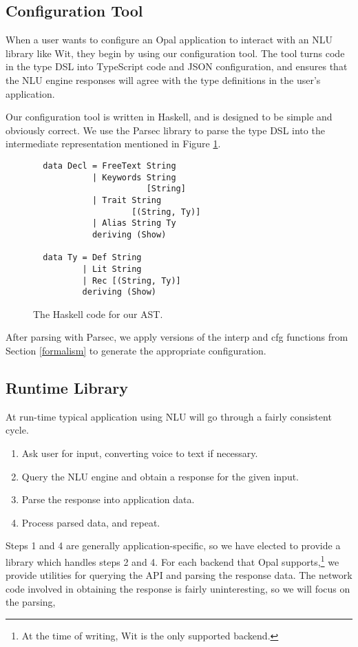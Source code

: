 \documentclass[twocolumn]{article}
\newcommand{\ff}[1]{\textsf{#1}}
\begin{document}
\subsection{Configuration Tool}
When a user wants to configure an Opal application to interact with an NLU
library like Wit, they begin by using our configuration tool. The tool turns
code in the type DSL into TypeScript code and JSON configuration, and ensures
that the NLU engine responses will agree with the type definitions in the user's
application.

Our configuration tool is written in Haskell, and is designed to be simple and
obviously correct. We use the Parsec library to parse the type DSL into the
intermediate representation mentioned in Figure \ref{fig:hs_ast}.\cite{parsec}

\begin{figure}
\begin{verbatim}
  data Decl = FreeText String
            | Keywords String
                       [String]
            | Trait String
                    [(String, Ty)]
            | Alias String Ty
            deriving (Show)

  data Ty = Def String
          | Lit String
          | Rec [(String, Ty)]
          deriving (Show)
\end{verbatim}
  \caption{The Haskell code for our AST.}
  \label{fig:hs_ast}
\end{figure}

After parsing with Parsec, we apply versions of the \ff{interp} and \ff{cfg}
functions from Section \ref{formalism} to generate the appropriate
configuration.

\subsection{Runtime Library}
At run-time typical application using NLU will go through a fairly consistent
cycle.
\begin{enumerate}
\item Ask user for input, converting voice to text if necessary.
\item Query the NLU engine and obtain a response for the given input.
\item Parse the response into application data.
\item Process parsed data, and repeat.
\end{enumerate}
Steps 1 and 4 are generally application-specific, so we have elected to provide
a library which handles steps 2 and 4. For each backend that Opal
supports,\footnote{At the time of writing, Wit is the only supported backend.}
we provide utilities for querying the API and parsing the response data. The
network code involved in obtaining the response is fairly uninteresting, so we
will focus on the parsing,
\end{document}

